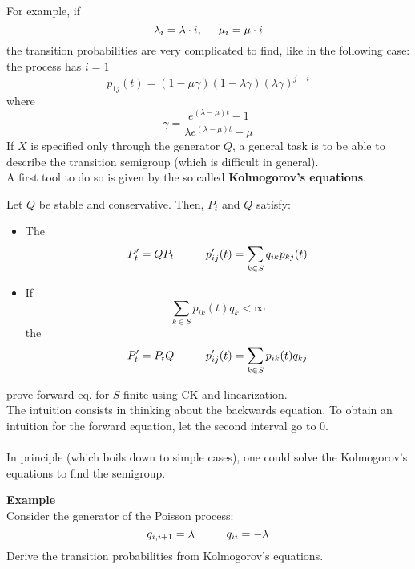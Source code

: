 \documentclass{article}
\begin{document}
	For example, if 
	\begin{equation*}
		\lambda_i = \lambda \cdot i, \hspace{0.5 cm} \mu_i = \mu \cdot i
	\end{equation*}
	the transition probabilities are very complicated to find, like in the following case: the process has $i = 1$
	\begin{equation*}
		p_{1j}(t) = (1-\mu \gamma) (1-\lambda \gamma) (\lambda \gamma)^{j-i}
	\end{equation*}
	where 
	\begin{equation*}
		\gamma= \frac{e^{(\lambda-\mu) t} - 1}{\lambda e^{(\lambda - \mu)t}-\mu}
	\end{equation*}
	If $X$ is specified only through the generator $Q$, a general task is to be able to describe the transition semigroup (which is difficult in general). \\
	A first tool to do so is given by the so called \textbf{Kolmogorov's equations}.
	\begin{theorem}
		Let $Q$ be stable and conservative. Then, $P_t$ and $Q$ satisfy:
		\begin{itemize}
			\item The 
			\begin{equation*}
				P'_t =  Q P_t \hspace{1 cm} p'_{ij}(t) = \sum_{k \in S} q_{ik}p_{kj}(t)
			\end{equation*}
			\item If 
			\begin{equation*}
				\sum_{k \in S} p_{ik}(t) q_k < \infty
			\end{equation*}
			the 
			\begin{equation*}
				P'_t = P_t Q \hspace{1 cm} p'_{ij}(t) = \sum_{k \in S} p_{ik}(t)q_{kj}
			\end{equation*}
		\end{itemize}
	\end{theorem}
	\begin{exercise}
		prove forward eq. for $S$ finite using CK and linearization.\\
		The intuition consists in thinking about the backwards equation.
		To obtain an intuition for the forward equation, let the second interval go to $0$.\\
		\\
		In principle (which boils down to simple cases), one could solve the Kolmogorov's equations to find the semigroup. \\
	\end{exercise}
	\textbf{Example} \\
	Consider the generator of the Poisson process:
	\begin{equation*}
		q_{i,i+1}=\lambda \hspace{1 cm} q_{ii} = - \lambda
	\end{equation*}
	Derive the transition probabilities from Kolmogorov's equations.
\end{document}
